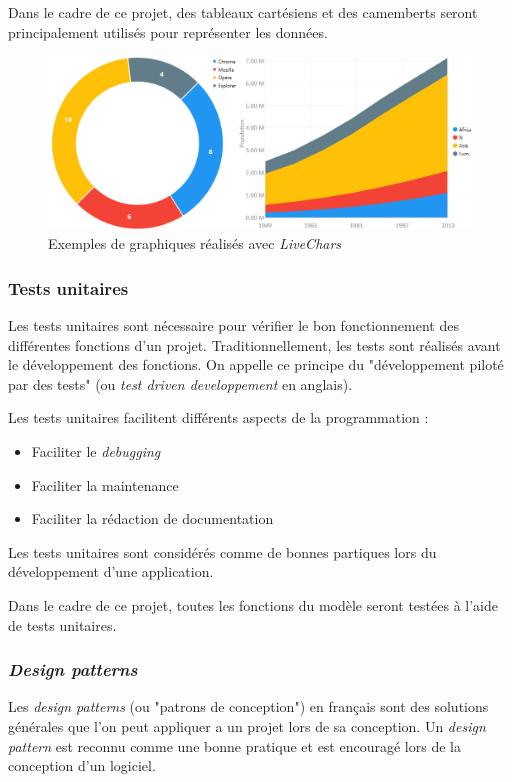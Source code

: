 \documentclass[a4paper, french]{article}
\begin{document}
Dans le cadre de ce projet, des tableaux cartésiens et des camemberts seront principalement utilisés pour représenter les données.

\vspace{0.5cm}
\begin{figure}[htp]
    \centering
    \includegraphics[width=\linewidth]{charts.png}
    \caption{Exemples de graphiques réalisés avec \textit{LiveChars}}
\end{figure}

\subsubsection{Tests unitaires}
Les tests unitaires sont nécessaire pour vérifier le bon fonctionnement des différentes fonctions d'un projet. Traditionnellement, les tests sont réalisés avant le développement des fonctions. On appelle ce principe du "développement piloté par des tests" (ou \textit{test driven developpement} en anglais). 

Les tests unitaires facilitent différents aspects de la programmation : 
\begin{itemize}
    \item Faciliter le \textit{debugging}
    \item Faciliter la maintenance
    \item Faciliter la rédaction de documentation
\end{itemize}

Les tests unitaires sont considérés comme de bonnes partiques lors du développement d'une application.

Dans le cadre de ce projet, toutes les fonctions du modèle seront testées à l'aide de tests unitaires.

\pagebreak
\subsubsection{\textit{Design patterns}}
Les \textit{design patterns} (ou "patrons de conception") en français sont des solutions générales que l'on peut appliquer a un projet lors de sa conception. Un \textit{design pattern} est reconnu comme une bonne pratique et est encouragé lors de la conception d'un logiciel.
\end{document}
